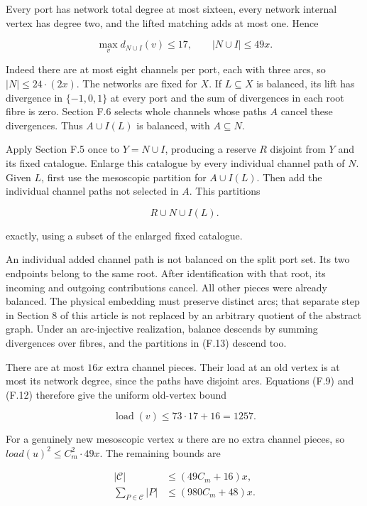 \documentclass[english,11pt,a4paper]{article}
\begin{document}
Every port has network total degree at most sixteen, every network internal vertex has degree two, and the lifted matching adds at most one. Hence

\[\max_v d_{N\cup I}(v)\le17,\qquad |N\cup I|\le49x.\tag{F.12}\]

Indeed there are at most eight channels per port, each with three arcs, so \(|N|\le 24\cdot (2x)\). The networks are fixed for \(X\). If \(L\subseteq X\) is balanced, its lift has divergence in \(\{-1,0,1\}\) at every port and the sum of divergences in each root fibre is zero. Section F.6 selects whole channels whose paths \(A\) cancel these divergences. Thus \(A\cup I(L)\) is balanced, with \(A\subseteq N\).

Apply Section F.5 once to \(Y=N\cup I\), producing a reserve \(R\) disjoint from \(Y\) and its fixed catalogue. Enlarge this catalogue by every individual channel path of \(N\). Given \(L\), first use the mesoscopic partition for \(A\cup I(L)\). Then add the individual channel paths not selected in \(A\). This partitions

\[R\cup N\cup I(L).\tag{F.13}\]

exactly, using a subset of the enlarged fixed catalogue.

An individual added channel path is not balanced on the split port set. Its two endpoints belong to the same root. After identification with that root, its incoming and outgoing contributions cancel. All other pieces were already balanced. The physical embedding must preserve distinct arcs; that separate step in Section 8 of this article is not replaced by an arbitrary quotient of the abstract graph. Under an arc-injective realization, balance descends by summing divergences over fibres, and the partitions in (F.13) descend too.

There are at most \(16x\) extra channel pieces. Their load at an old vertex is at most its network degree, since the paths have disjoint arcs. Equations (F.9) and (F.12) therefore give the uniform old-vertex bound

\[\operatorname{load}(v)\le73\cdot17+16=1257.\tag{F.14}\]

For a genuinely new mesoscopic vertex \(u\) there are no extra channel pieces, so \(load(u)^{2}\le C_{m}^{2}\cdot 49x\). The remaining bounds are

\[\begin{aligned}|\mathcal C|&\le(49C_m+16)x,\\\sum_{P\in\mathcal C}|P|&\le(980C_m+48)x.\end{aligned}\tag{F.15}\]
\end{document}
